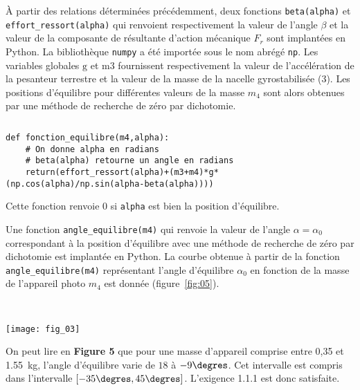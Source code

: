 \ifprof
\else
À partir des relations déterminées précédemment, deux fonctions \texttt{beta(alpha)} et \texttt{effort\_ressort(alpha)} qui renvoient respectivement la valeur de l'angle $\beta$ et la valeur de la composante de résultante d'action mécanique $F_{r}$ sont implantées en Python. La bibliothèque \texttt{numpy} a été importée sous le nom abrégé \texttt{np}. Les variables globales $\mathrm{g}$ et $\mathrm{m} 3$ fournissent respectivement la valeur de l'accélération de la pesanteur terrestre et la valeur de la masse de la nacelle gyrostabilisée (3). Les positions d'équilibre pour différentes valeurs de la masse $m_{4}$ sont alors obtenues par une méthode de recherche de zéro par dichotomie.
\fi

\ifprof
\begin{corrige} $\quad$
\begin{lstlisting}
def fonction_equilibre(m4,alpha):
    # On donne alpha en radians
    # beta(alpha) retourne un angle en radians
    return(effort_ressort(alpha)+(m3+m4)*g*(np.cos(alpha)/np.sin(alpha-beta(alpha))))
\end{lstlisting}

Cette fonction renvoie 0 si \texttt{alpha} est bien la position d'équilibre.

\end{corrige}
\else
\fi

\ifprof
\else
Une fonction \texttt{angle\_equilibre(m4)} qui renvoie la valeur de l'angle $\alpha=\alpha_{0}$ correspondant à la position d'équilibre avec une méthode de recherche de zéro par dichotomie est implantée en Python. La courbe obtenue à partir de la fonction \texttt{angle\_equilibre(m4)} représentant l'angle d'équilibre $\alpha_{0}$ en fonction de la masse de l'appareil photo $m_{4}$ est donnée (figure~\ref{fig:05}).
\fi

\ifprof
\begin{corrige} ~\\ $\quad$
\begin{center}
\texttt{[image: fig\_03]}
\end{center}

On peut lire en \textbf{Figure 5} que pour une masse d'appareil comprise entre 0,35 et \SI{1,55}{kg}, l'angle d'équilibre varie de $18$ à $-9\degres$. Cet intervalle est compris dans l'intervalle $\left[-35\degres,45\degres\right]$. L'exigence 1.1.1 est donc satisfaite.
\end{corrige}
\else
\fi

